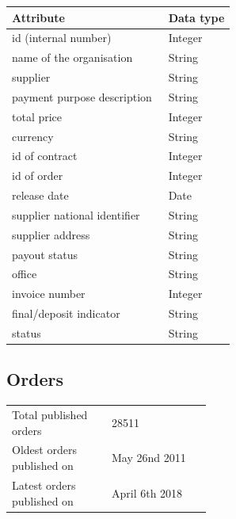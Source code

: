 \documentclass[thesis=B,english]{FITthesis}[2012/06/26]
\begin{document}
    \begin{center}
        \begin{tabular}{  p{0.7\linewidth} | p{0.3\linewidth} }
        Attribute & Data type\\ \hline
        id (internal number) & Integer \\
        name of the organisation & String \\
        supplier & String \\
        payment purpose description & String \\
        total price & Integer \\
        currency & String \\
        id of contract & Integer \\
        id of order & Integer \\
        release date & Date \\
        supplier national identifier & String \\
        supplier address & String \\
        payout status & String \\
        office & String \\
        invoice number & Integer \\
        final/deposit indicator & String \\
        status & String \\
        \end{tabular}
    \end{center}
	\subsection{Orders}
	\begin{tabular}{  p{0.5\linewidth}  l }
        \\
        Total published orders & 28511 \\
        Oldest orders published on & May 26nd 2011\\
        Latest orders published on & April 6th 2018 \\
        \end{tabular}
        
\end{document}
